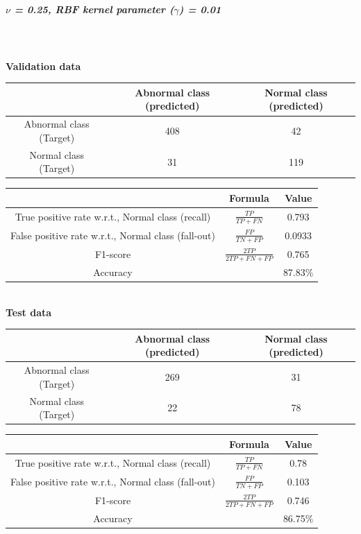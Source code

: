\documentclass[fleqn]{article}
\begin{document}
\subparagraph{$\nu$ = 0.25, RBF kernel parameter ($\gamma$) = 0.01}
~\\\\
\textbf{Validation data}\\

\begin{center}
  \begin{longtable}{ c | c | c  }
	\multicolumn{1}{c}{ } & 
	\multicolumn{1}{c}{Abnormal class (predicted)} & 
	\multicolumn{1}{c}{Normal class (predicted)} \\
    \hline
    Abnormal class (Target)& 408 & 42 \\ \hline
    Normal class (Target)&  31 & 119 \\ \hline
  \end{longtable}
\end{center}    

\begin{center}
  \begin{longtable}{ c | c | c  }
  	\multicolumn{1}{c}{ } & 
	\multicolumn{1}{c}{Formula} & 
	\multicolumn{1}{c}{Value} \\\hline
	True positive rate w.r.t., Normal class (recall)  & $\frac{TP}{TP + FN}$ & 0.793 \\\hline
	False positive rate w.r.t., Normal class (fall-out)  & $\frac{FP}{TN + FP}$ & 0.0933\\\hline
	F1-score & $\frac{2TP}{2TP + FN + FP}$ & 0.765\\\hline
	Accuracy  & & 87.83\%\\\hline
  \end{longtable}
\end{center} 


~\\
\textbf{Test data}\\

\begin{center}
  \begin{longtable}{ c | c | c  }
	\multicolumn{1}{c}{ } & 
	\multicolumn{1}{c}{Abnormal class (predicted)} & 
	\multicolumn{1}{c}{Normal class (predicted)} \\
    \hline
    Abnormal class (Target)& 269 & 31 \\ \hline
    Normal class (Target)& 22 & 78 \\ \hline
  \end{longtable}
\end{center}    

\begin{center}
  \begin{longtable}{ c | c | c  }
  	\multicolumn{1}{c}{ } & 
	\multicolumn{1}{c}{Formula} & 
	\multicolumn{1}{c}{Value} \\\hline
	True positive rate w.r.t., Normal class (recall)  & $\frac{TP}{TP + FN}$ & 0.78 \\\hline
	False positive rate w.r.t., Normal class (fall-out)  & $\frac{FP}{TN + FP}$ & 0.103\\\hline
	F1-score & $\frac{2TP}{2TP + FN + FP}$ & 0.746\\\hline
	Accuracy & & 86.75\%\\\hline
  \end{longtable}
\end{center} 
\end{document}
